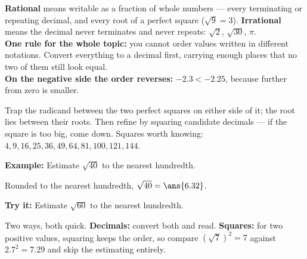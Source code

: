 \documentclass[12pt]{article}
\begin{document}

\begin{formulabox}
\textbf{Rational} means writable as a fraction of whole numbers --- every
terminating or repeating decimal, and every root of a perfect square
($\sqrt{9}=3$). \textbf{Irrational} means the decimal never terminates and
never repeats: $\sqrt{2}$, $\sqrt{30}$, $\pi$.\\[3pt]
\textbf{One rule for the whole topic:} you cannot order values written in
different notations. Convert everything to a decimal first, carrying enough
places that no two of them still look equal.\\[3pt]
\textbf{On the negative side the order reverses:} $-2.3<-2.25$, because
further from zero is smaller.
\end{formulabox}


\begin{formulabox}
Trap the radicand between the two perfect squares on either side of it; the
root lies between their roots. Then refine by squaring candidate decimals ---
if the square is too big, come down. Squares worth knowing:
$4,9,16,25,36,49,64,81,100,121,144$.
\end{formulabox}

\begin{examplebox}
\textbf{Example:} Estimate $\sqrt{40}$ to the nearest hundredth.

Rounded to the nearest hundredth, $\sqrt{40}=\ans{6.32}$.
\end{examplebox}

\begin{tryitbox}
\textbf{Try it:} Estimate $\sqrt{60}$ to the nearest hundredth.\\[2pt]
\end{tryitbox}


\begin{formulabox}
Two ways, both quick. \textbf{Decimals:} convert both and read. \textbf{Squares:}
for two positive values, squaring keeps the order, so compare $(\sqrt{7})^2=7$
against $2.7^2=7.29$ and skip the estimating entirely.
\end{formulabox}
\end{document}
